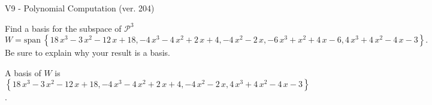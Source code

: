 \begin{exercise}
  \begin{exerciseTitle}V9 - Polynomial Computation (ver. 204)\end{exerciseTitle}
  \begin{exerciseStatement}
    Find a basis for the subspace of \(\mathcal{P}^3\) 
\[W=\mathrm{span}\ \left\{18 \, x^{3} - 3 \, x^{2} - 12 \, x + 18 , -4 \, x^{3} - 4 \, x^{2} + 2 \, x + 4 , -4 \, x^{2} - 2 \, x , -6 \, x^{3} + x^{2} + 4 \, x - 6 , 4 \, x^{3} + 4 \, x^{2} - 4 \, x - 3\right\}.\]
 Be sure to explain why your result is a basis.


  \end{exerciseStatement}
  \begin{exerciseAnswer}
   A basis of \(W\) is  \(\left\{18 \, x^{3} - 3 \, x^{2} - 12 \, x + 18 , -4 \, x^{3} - 4 \, x^{2} + 2 \, x + 4 , -4 \, x^{2} - 2 \, x , 4 \, x^{3} + 4 \, x^{2} - 4 \, x - 3\right\}\).
  


  \end{exerciseAnswer}
\end{exercise}